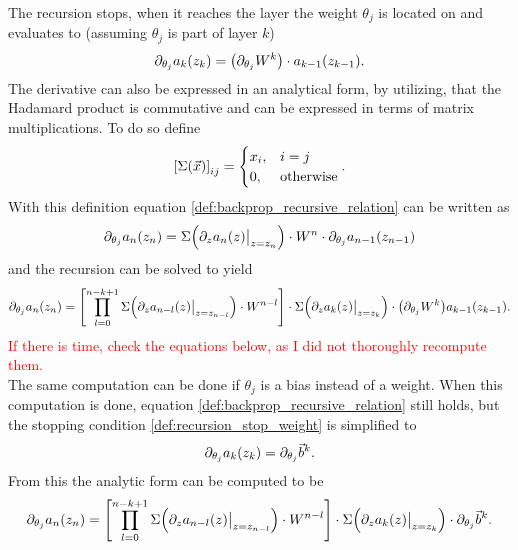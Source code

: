 The recursion stops, when it reaches the layer the weight $\theta_j$ is located on and evaluates to (assuming $\theta_j$ is part of layer $k$)
\begin{equation}\label{def:recursion_stop_weight}
\partial_{\theta_j}a_k{\left( z_k \right)}={\left( \partial_{\theta_j}W^k \right)}\cdot a_{k-1}{\left( z_{k-1} \right)}.
\end{equation}
The derivative can also be expressed in an analytical form, by utilizing, that the Hadamard product is commutative and can be expressed in terms of matrix multiplications. To do so define
\begin{equation}
\left[\Sigma{\left( \vec{x} \right)}\right]_{ij}=
\begin{cases}
	x_i,& i = j\\
	0,& \text{otherwise}
\end{cases}.
\end{equation}
With this definition equation \eqref{def:backprop_recursive_relation} can be written as
\begin{equation}
\partial_{\theta_j}a_n\lr{z_n} = \Sigma\lr{\partial_z \restr{a_n(z)}{z=z_n}}\cdot W^n\cdot\partial_{\theta_j}a_{n-1}\lr{z_{n-1}}
\end{equation}
and the recursion can be solved to yield
\begin{equation}\label{def:backprop_analytical_weight}
\partial_{\theta_j}a_n\lr{z_n} = \left[\prod_{l=0}^{n-k+1}\Sigma\lr{\restr{\partial_z a_{n-l}\lr{z}}{z=z_{n-l}}}\cdot W^{n-l}\right]\cdot \Sigma\lr{\restr{\partial_z a_k\lr{z}}{z=z_k}}\cdot\lr{\partial_{\theta_j}W^k}a_{k-1}\lr{z_{k-1}}.
\end{equation}
\textcolor{red}{If there is time, check the equations below, as I did not thoroughly recompute them.}\\
The same computation can be done if $\theta_j$ is a bias instead of a weight. When this computation is done, equation \eqref{def:backprop_recursive_relation} still holds, but the stopping condition \eqref{def:recursion_stop_weight} is simplified to
\begin{equation}
\partial_{\theta_j}a_k{\left( z_k \right)}=\partial_{\theta_j}\vec{b}^k.
\end{equation}
From this the analytic form can be computed to be
\begin{equation}\label{def:backprop_analytical_bias}
\partial_{\theta_j}a_n\lr{z_n} = \left[\prod_{l=0}^{n-k+1}\Sigma\lr{\restr{\partial_z a_{n-l}\lr{z}}{z=z_{n-l}}}\cdot W^{n-l}\right]\cdot \Sigma\lr{\restr{\partial_z a_k\lr{z}}{z=z_k}}\cdot\partial_{\theta_j}\vec{b}^k.
\end{equation}
